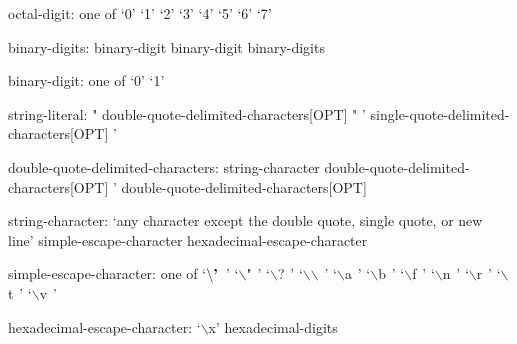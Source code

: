 \begin{syntax}
octal-digit: one of
  `0' `1' `2' `3' `4' `5' `6' `7'
\end{syntax}

\begin{syntax}
binary-digits:
  binary-digit
  binary-digit binary-digits
\end{syntax}

\begin{syntax}
binary-digit: one of
  `0' `1'
\end{syntax}

\begin{syntax}
string-literal:
  " double-quote-delimited-characters[OPT] "
  ' single-quote-delimited-characters[OPT] '
\end{syntax}

\begin{syntax}
double-quote-delimited-characters:
  string-character double-quote-delimited-characters[OPT]
  ' double-quote-delimited-characters[OPT]
\end{syntax}

\begin{syntax}
string-character:
  `any character except the double quote, single quote, or new line'
  simple-escape-character
  hexadecimal-escape-character
\end{syntax}

\begin{syntax}
simple-escape-character: one of
  `$\backslash\mbox{\bf '}\hspace{5pt}$' `$\backslash$"$\hspace{5pt}$' `$\backslash$?$\hspace{5pt}$' `$\backslash$$\backslash$$\hspace{5pt}$' `$\backslash$a$\hspace{5pt}$' `$\backslash$b$\hspace{5pt}$' `$\backslash$f$\hspace{5pt}$' `$\backslash$n$\hspace{5pt}$' `$\backslash$r$\hspace{5pt}$' `$\backslash$t$\hspace{5pt}$' `$\backslash$v$\hspace{5pt}$'
\end{syntax}

\begin{syntax}
hexadecimal-escape-character:
  `$\backslash$x' hexadecimal-digits
\end{syntax}

